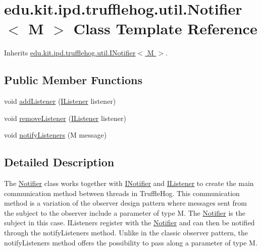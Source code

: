 \hypertarget{classedu_1_1kit_1_1ipd_1_1trufflehog_1_1util_1_1_notifier}{}\section{edu.\+kit.\+ipd.\+trufflehog.\+util.\+Notifier$<$ M $>$ Class Template Reference}
\label{classedu_1_1kit_1_1ipd_1_1trufflehog_1_1util_1_1_notifier}


Inherits \hyperlink{interfaceedu_1_1kit_1_1ipd_1_1trufflehog_1_1util_1_1_i_notifier}{edu.\+kit.\+ipd.\+trufflehog.\+util.\+I\+Notifier$<$ M $>$}.

\subsection*{Public Member Functions}
\begin{DoxyCompactItemize}
\item 
void \hyperlink{classedu_1_1kit_1_1ipd_1_1trufflehog_1_1util_1_1_notifier_a908802ab20919bacda48b4074241bff0}{add\+Listener} (\hyperlink{interfaceedu_1_1kit_1_1ipd_1_1trufflehog_1_1util_1_1_i_listener}{I\+Listener} listener)
\item 
void \hyperlink{classedu_1_1kit_1_1ipd_1_1trufflehog_1_1util_1_1_notifier_a61f6386667349603224ac491d81e63ec}{remove\+Listener} (\hyperlink{interfaceedu_1_1kit_1_1ipd_1_1trufflehog_1_1util_1_1_i_listener}{I\+Listener} listener)
\item 
void \hyperlink{classedu_1_1kit_1_1ipd_1_1trufflehog_1_1util_1_1_notifier_a053325c077de89e7b57db74174eaa18b}{notify\+Listeners} (M message)
\end{DoxyCompactItemize}


\subsection{Detailed Description}
The \hyperlink{classedu_1_1kit_1_1ipd_1_1trufflehog_1_1util_1_1_notifier}{Notifier} class works together with \hyperlink{interfaceedu_1_1kit_1_1ipd_1_1trufflehog_1_1util_1_1_i_notifier}{I\+Notifier} and \hyperlink{interfaceedu_1_1kit_1_1ipd_1_1trufflehog_1_1util_1_1_i_listener}{I\+Listener} to create the main communication method between threads in Truffle\+Hog. This communication method is a variation of the observer design pattern where messages sent from the subject to the observer include a parameter of type M. The \hyperlink{classedu_1_1kit_1_1ipd_1_1trufflehog_1_1util_1_1_notifier}{Notifier} is the subject in this case. I\+Listeners register with the \hyperlink{classedu_1_1kit_1_1ipd_1_1trufflehog_1_1util_1_1_notifier}{Notifier} and can then be notified through the notify\+Listeners method. Unlike in the classic observer pattern, the notify\+Listeners method offers the possibility to pass along a parameter of type M. 

